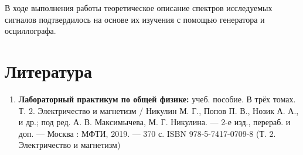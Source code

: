 \documentclass[a4paper, 12pt]{article}%
\begin{document}
В ходе выполнения работы теоретическое описание спектров исследуемых сигналов подтвердилось на основе их изучения с помощью генератора и осциллографа.
 
\section{Литература}

\begin{enumerate}

\item \textbf{Лабораторный практикум по общей физике:} учеб. пособие. В трёх томах. Т. 2. Электричество и магнетизм /
Никулин М. Г., Попов П. В., Нозик А. А., и др.; под ред. А. В. Мак­симычева, М. Г. Никулина. — 2-е изд., перераб. и доп. — Москва : МФТИ, 2019. — 370 с.
ISBN 978-5-7417-0709-8 (Т. 2. Электричество и магнетизм)
\end{enumerate}		
		
\end{document}
